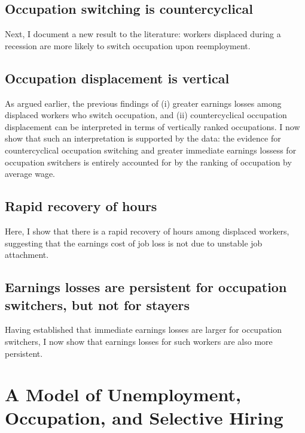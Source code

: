 \documentclass[12pt]{article}
\theoremstyle{definition}
\begin{document}
\subsection{Occupation switching is countercyclical}

Next, I document a new result to the literature: workers displaced during a recession are more likely to switch occupation upon reemployment. 


\subsection{Occupation displacement is vertical}

As argued earlier, the previous findings of (i) greater earnings losses among displaced workers who switch occupation, and (ii) countercyclical occupation displacement can be interpreted in terms of vertically ranked occupations. I now show that such an interpretation is supported by the data: the evidence for countercyclical occupation switching and greater immediate earnings lossess for occupation switchers is entirely accounted for by the ranking of occupation by average wage. 

\subsection{Rapid recovery of hours}

Here, I show that there is a rapid recovery of hours among displaced workers, suggesting that the earnings cost of job loss is not due to unstable job attachment. 

\subsection{Earnings losses are persistent for occupation switchers, but not for stayers}

Having established that immediate earnings losses are larger for occupation switchers, I now show that earnings losses for such workers are also more persistent. 

\section{A Model of Unemployment, Occupation, and Selective Hiring}
\end{document}

